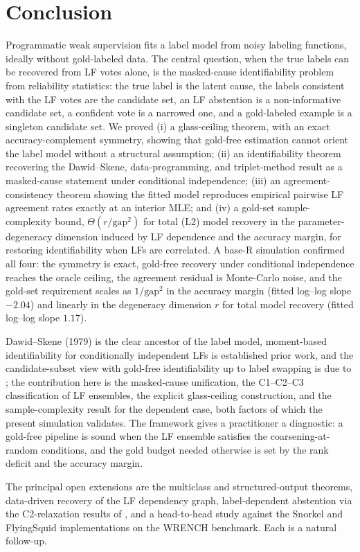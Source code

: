 \section{Conclusion}
\label{sec:conclusion}

Programmatic weak supervision fits a label model from noisy labeling
functions, ideally without gold-labeled data. The central question,
when the true labels can be recovered from LF votes alone, is the
masked-cause identifiability problem from reliability statistics: the
true label is the latent cause, the labels consistent with the LF
votes are the candidate set, an LF abstention is a non-informative
candidate set, a confident vote is a narrowed one, and a gold-labeled
example is a singleton candidate set. We proved (i) a glass-ceiling
theorem, with an exact accuracy-complement symmetry, showing that
gold-free estimation cannot orient the label model without a
structural assumption; (ii) an identifiability theorem recovering the
Dawid--Skene, data-programming, and triplet-method result as a
masked-cause statement under conditional independence; (iii) an
agreement-consistency theorem showing the fitted model reproduces
empirical pairwise LF agreement rates exactly at an interior MLE; and
(iv) a gold-set sample-complexity bound, $\Theta(r / \mathrm{gap}^2)$
for total (L2) model recovery in the parameter-degeneracy dimension
induced by LF dependence and the accuracy margin, for restoring
identifiability when LFs are correlated. A base-R
simulation confirmed all four: the symmetry is exact, gold-free
recovery under conditional independence reaches the oracle ceiling,
the agreement residual is Monte-Carlo noise, and the gold-set
requirement scales as $1/\mathrm{gap}^2$ in the accuracy margin (fitted
log--log slope $-2.04$) and linearly in the degeneracy dimension $r$
for total model recovery (fitted log--log slope $1.17$).

Dawid--Skene (1979) is the clear ancestor of the label model,
moment-based identifiability for conditionally independent LFs is
established prior work, and the candidate-subset view with gold-free
identifiability up to label swapping is due to \citet{yu2022nplm}; the
contribution here is the masked-cause
unification, the C1--C2--C3 classification of LF ensembles, the
explicit glass-ceiling construction, and the sample-complexity result
for the dependent case, both factors of which the present simulation
validates. The framework gives a practitioner a
diagnostic: a gold-free pipeline is sound when the LF ensemble
satisfies the coarsening-at-random conditions, and the gold budget
needed otherwise is set by the rank deficit and the accuracy margin.

The principal open extensions are the multiclass and structured-output
theorems, data-driven recovery of the LF dependency graph,
label-dependent abstention via the C2-relaxation results of
\citet{towell2026mdrelax}, and a head-to-head study against the
Snorkel and FlyingSquid implementations on the WRENCH benchmark.
Each is a natural follow-up.
